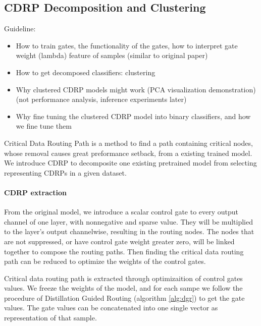 \documentclass[sigplan,10pt,review]{acmart}\settopmatter{printfolios=true,printccs=false,printacmref=false}
\begin{document}
\subsection{CDRP Decomposition and Clustering}
Guideline:
\begin{itemize}
	\item How to train gates, the functionality of the gates, how to interpret gate weight (lambda) feature of samples (similar to original paper)
	\item How to get decomposed classifiers: clustering
	\item Why clustered CDRP models might work (PCA visualization demonstration) (not performance analysis, inference experiments later)
	\item Why fine tuning the clustered CDRP model into binary classifiers, and how we fine tune them
\end{itemize}

Critical Data Routing Path is a method to find a path containing critical nodes, whose removal causes great preformance setback, from a existing trained model. We introduce CDRP to decomposite one existing pretrained model from selecting representing CDRPs in a given dataset.

\paragraph{CDRP extraction}

From the original model, we introduce a scalar control gate to every output channel of one layer, with nonnegative and sparse value. They will be multiplied to the layer’s output channelwise, resulting in the routing nodes. The nodes that are not suppressed, or have control gate weight greater zero, will be linked together to compose the routing paths. Then finding the critical data routing path can be reduced to optimize the weights of the control gates.

Critical data routing path is extracted through optimizaition of control gates values. We freeze the weights of the model, and for each sampe we follow the procedure of Distillation Guided Routing (algorithm \ref{alg:dgr}) \cite{wang2018interpret} to get the gate values. The gate values can be concatenated into one single vector as representation of that sample.
\end{document}
